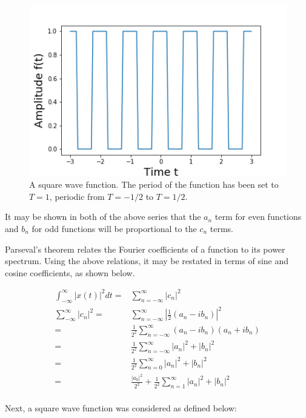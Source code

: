 \documentclass[twocolumn]{article}
\begin{document}
\begin{figure}[t]
	\centering
	\includegraphics[width=\linewidth]{Figure1}
	\caption{A square wave function. The period of the function has been set to $T=1$, periodic from $T=-1/2$ to $T=1/2$.}
	\label{fig:square}
\end{figure}

It may be shown in both of the above series that the $a_n$ term for even functions and $b_n$ for odd functions will be proportional to the $c_n$ terms. 

Parseval's theorem relates the Fourier coefficients of a function to its power spectrum. Using the above relations, it may be restated in terms of sine and cosine coefficients, as shown below.

\begin{equation}
\begin{split}
\int_{-\infty}^{\infty} |x(t)|^2 dt =& \sum_{n=-\infty}^{\infty} |c_n|^2 \\
\sum_{-\infty}^{\infty} |c_n|^2 =& \sum_{n=-\infty}^{\infty} |\frac{1}{2}(a_n - ib_n)|^2 \\
=& \frac{1}{2^2}\sum_{n=-\infty}^{\infty} (a_n - ib_n)(a_n + ib_n) \\
=& \frac{1}{2^2}\sum_{n=-\infty}^{\infty} |a_n|^2 + |b_n|^2 \\
=& \frac{1}{2^2}\sum_{n=0}^{\infty} |a_n|^2 + |b_n|^2 \\
=& \frac{|a_0|^2}{2^2} + \frac{1}{2^2}\sum_{n=1}^{\infty} |a_n|^2 + |b_n|^2 \\
\end{split}
\end{equation}

Next, a square wave function was considered as defined below: 
\end{document}
